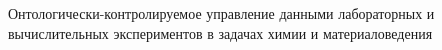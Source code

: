 Онтологически-контролируемое управление данными лабораторных и вычислительных экспериментов в задачах химии и материаловедения